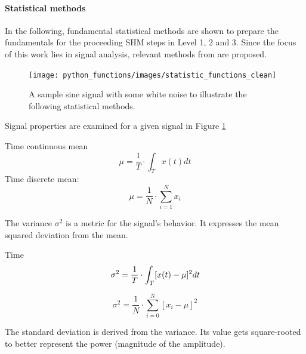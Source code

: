 \paragraph{Statistical methods}
In the following, fundamental statistical methods are shown to prepare the fundamentals for the proceeding SHM steps in Level 1, 2 and 3. Since the focus of this work lies in signal analysis, relevant methods from \textcite{smith_scientist_1999} are proposed.
\begin{figure}[h]
    \centering
    \texttt{[image: python\_functions/images/statistic\_functions\_clean]}
    \caption[Noisy Sine Signal]{A sample sine signal with some white noise to illustrate the following statistical methods.}
    \label{fig:statistics_clean}
\end{figure}

Signal properties are examined for a given signal in Figure \ref{fig:statistics_clean}



\cite[S.13-17]{smith_scientist_1999}

Time continuous mean
\begin{equation}
    \label{eq:mean_cont}
    \mu=\frac{1}{T} \cdot \int_T x(t) d t
\end{equation}
Time discrete mean:
\begin{equation}
    \label{eq:mean_disc}
    \mu=\frac{1}{N} \cdot \sum_{i=1}^{N} x_i
\end{equation}




The variance $\sigma^2$ is a metric for the signal's behavior. It expresses the mean squared deviation from the mean.

Time
\begin{equation}
    \label{eq:var_cont}
    \sigma^2=\frac{1}{T} \cdot \int_T[x(t)-\mu]^2 d t\\
\end{equation}

\begin{equation}
    \label{eq:var_disc}
    \sigma^2=\frac{1}{N} \cdot \sum_{i=0}^{N}\left[x_i-\mu\right]^2
\end{equation}

The standard deviation is derived from the variance. Its value gets square-rooted to better represent the power (magnitude of the amplitude).

